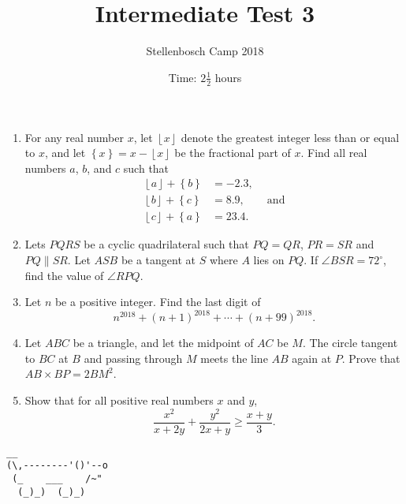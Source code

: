 \documentclass{article}
\title{Intermediate Test 3}
\author{Stellenbosch Camp 2018}
\date{Time: $2\frac{1}{2}$ hours}
\newcommand{\floor}[1]{\ensuremath{\left\lfloor#1\right\rfloor}}
\newcommand{\fracpart}[1]{\ensuremath{\left\{#1\right\}}}
\begin{document}
\maketitle

\begin{enumerate}[1.]

\item %
For any real number $x$, let $\floor{x}$ denote the greatest integer less than or equal to $x$, and let $\fracpart{x} = x -\floor{x}$ be the fractional part of $x$. Find all real numbers $a$, $b$, and $c$ such that
\begin{align*}
  \floor{a} +\fracpart{b} &= -2.3, \\
  \floor{b} +\fracpart{c} &= 8.9, \qquad \mathrm{and}\\
  \floor{c} +\fracpart{a} &= 23.4.
\end{align*}


\vspace{12pt}
\item %
Lets $PQRS$ be a cyclic quadrilateral such that $PQ = QR$, $PR = SR$ and $PQ \parallel SR$. Let $ASB$ be a tangent at $S$ where $A$ lies on $PQ$. If $\angle BSR = 72^{\circ}$, find the value of $\angle RPQ$.


\vspace{12pt}
\item %
Let $n$ be a positive integer. Find the last digit of \[ n^{2018} +(n+1)^{2018} +\dotsb +(n+99)^{2018}. \]


\vspace{12pt}
\item %
Let $ABC$ be a triangle, and let the midpoint of $AC$ be $M$. The circle tangent to $BC$ at $B$ and passing through $M$ meets the line $AB$ again at $P$. Prove that $AB \times BP = 2 BM^2$.


\vspace{12pt}
\item %
Show that for all positive real numbers $x$ and $y$, \[ \frac{x^2}{x+2y} +\frac{y^2}{2x+y} \geq \frac{x+y}{3}. \] 


\end{enumerate}


\vspace{12pt}
\begin{center}
\begin{BVerbatim}
__
(\,--------'()'--o
 (_    ___    /~"
  (_)_)  (_)_)
\end{BVerbatim}
\end{center}
\end{document}
